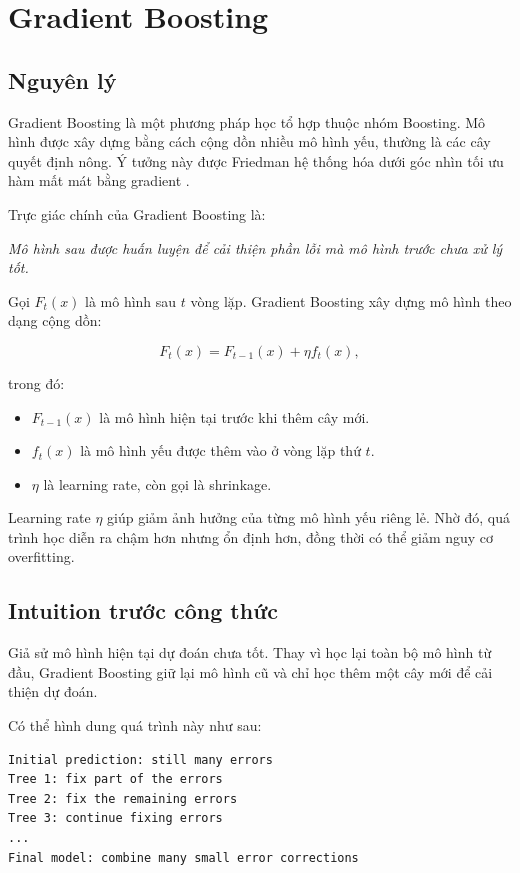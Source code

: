 \section{Gradient Boosting}

\subsection{Nguyên lý}

Gradient Boosting là một phương pháp học tổ hợp thuộc nhóm Boosting. Mô hình được xây dựng bằng cách cộng dồn nhiều mô hình yếu, thường là các cây quyết định nông. Ý tưởng này được Friedman hệ thống hóa dưới góc nhìn tối ưu hàm mất mát bằng gradient \cite{friedman2001gradient}.

Trực giác chính của Gradient Boosting là:

\begin{center}
\textit{Mô hình sau được huấn luyện để cải thiện phần lỗi mà mô hình trước chưa xử lý tốt.}
\end{center}

Gọi $F_t(x)$ là mô hình sau $t$ vòng lặp. Gradient Boosting xây dựng mô hình theo dạng cộng dồn:

\[
F_t(x) = F_{t-1}(x) + \eta f_t(x),
\]

trong đó:

\begin{itemize}
    \item $F_{t-1}(x)$ là mô hình hiện tại trước khi thêm cây mới.
    \item $f_t(x)$ là mô hình yếu được thêm vào ở vòng lặp thứ $t$.
    \item $\eta$ là learning rate, còn gọi là shrinkage.
\end{itemize}

Learning rate $\eta$ giúp giảm ảnh hưởng của từng mô hình yếu riêng lẻ. Nhờ đó, quá trình học diễn ra chậm hơn nhưng ổn định hơn, đồng thời có thể giảm nguy cơ overfitting.

\subsection{Intuition trước công thức}

Giả sử mô hình hiện tại dự đoán chưa tốt. Thay vì học lại toàn bộ mô hình từ đầu, Gradient Boosting giữ lại mô hình cũ và chỉ học thêm một cây mới để cải thiện dự đoán.

Có thể hình dung quá trình này như sau:

\begin{lstlisting}[style=pseudocode, caption={Trực giác quá trình Boosting}, label={lst:boosting_intuition}]
Initial prediction: still many errors
Tree 1: fix part of the errors
Tree 2: fix the remaining errors
Tree 3: continue fixing errors
...
Final model: combine many small error corrections
\end{lstlisting}

